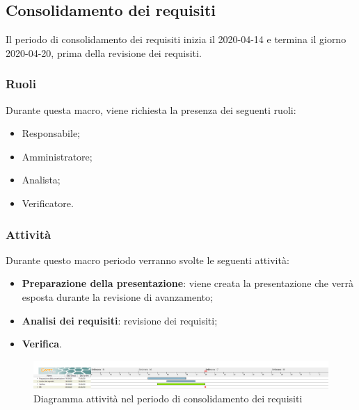 \documentclass[../piano-di-progetto.tex]{subfiles}
\begin{document}
\subsection{Consolidamento dei requisiti}
Il periodo di consolidamento dei requisiti inizia il 2020-04-14 e termina il giorno 2020-04-20, prima della revisione dei requisiti. 

\subsubsection{Ruoli}
Durante questa macro, viene richiesta la presenza dei seguenti ruoli:
\begin{itemize}
    \item Responsabile;
    \item Amministratore;
    \item Analista;
    \item Verificatore.
\end{itemize}

\subsubsection{Attività}
Durante questo macro periodo verranno svolte le seguenti attività:
\begin{itemize}
    \item \textbf{Preparazione della presentazione}: viene creata la presentazione che verrà esposta durante la revisione di avanzamento;
    \item \textbf{Analisi dei requisiti}: revisione dei requisiti;
    \item \textbf{Verifica}.
\end{itemize}


\newpage
\begin{landscape}
    \begin{figure}[H]
        \centering
        \includegraphics[width=24cm]{img/consolidamento.png}
        \caption{Diagramma attività nel periodo di consolidamento dei requisiti}
      \end{figure}
\end{landscape}
\end{document}
